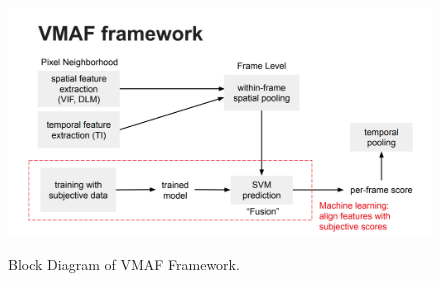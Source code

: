 \documentclass{book}
\begin{document}
\begin{figure}[hbt!]
	\centering
	{\includegraphics[width=\columnwidth]{pictures/ch4/VMAF_blk.png}
		\label{fig:VMAF_blkg}}
	\caption{Block Diagram of VMAF Framework.}\cite{bampis2018spatiotemporal}
\end{figure}
\end{document}
